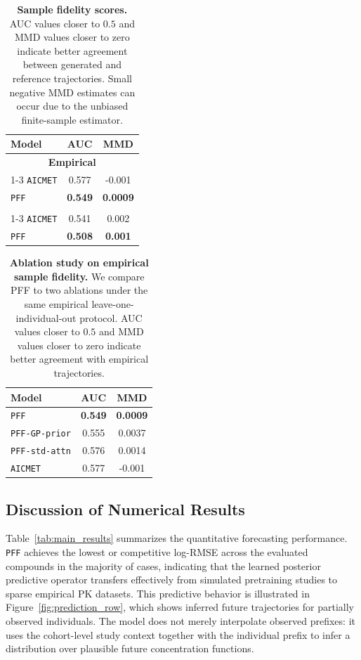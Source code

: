 \begin{table}[t]
\centering
\caption{\textbf{Sample fidelity scores.} AUC values closer to $0.5$ and MMD values closer to zero indicate better agreement between generated and reference trajectories. Small negative MMD estimates can occur due to the unbiased finite-sample estimator.}
\label{tab:sample_fidelity}
\scriptsize
\begin{tabular}{lcc}
\toprule
\textbf{Model} & \textbf{AUC} & \textbf{MMD} \\
\midrule
\multicolumn{3}{c}{\textbf{Empirical}} \\
\cmidrule(lr){1-3}
\texttt{AICMET} & 0.577 & -0.001 \\
\texttt{PFF} & \textbf{0.549} & \textbf{0.0009} \\
\addlinespace
\multicolumn{3}{c}{\textbf{Synthetic}} \\
\cmidrule(lr){1-3}
\texttt{AICMET} & 0.541 & 0.002 \\
\texttt{PFF} & \textbf{0.508} & \textbf{0.001} \\
\bottomrule
\end{tabular}
\end{table}

\begin{table}[t]
\centering
\caption{\textbf{Ablation study on empirical sample fidelity.} We compare PFF to two ablations under the same empirical leave-one-individual-out protocol. AUC values closer to $0.5$ and MMD values closer to zero indicate better agreement with empirical trajectories.}
\label{tab:pff_ablation}
\scriptsize
\begin{tabular}{lcc}
\toprule
\textbf{Model} & \textbf{AUC} & \textbf{MMD} \\
\midrule
\texttt{PFF} & \textbf{0.549} & \textbf{0.0009} \\
\texttt{PFF-GP-prior} & 0.555 & 0.0037 \\
\texttt{PFF-std-attn} & 0.576 & 0.0014 \\
\texttt{AICMET} & 0.577 & -0.001 \\
\bottomrule
\end{tabular}
\end{table}

\subsection{Discussion of Numerical Results}
\label{sec:numerical_results}

Table~\ref{tab:main_results} summarizes the quantitative forecasting performance.
%
\texttt{PFF} achieves the lowest or competitive log-RMSE across the evaluated compounds in the majority of cases, indicating that the learned posterior predictive operator transfers effectively from simulated pretraining studies to sparse empirical PK datasets.
%
This predictive behavior is illustrated in Figure~\ref{fig:prediction_row}, which shows inferred future trajectories for partially observed individuals.
%
The model does not merely interpolate observed prefixes: it uses the cohort-level study context together with the individual prefix to infer a distribution over plausible future concentration functions.

